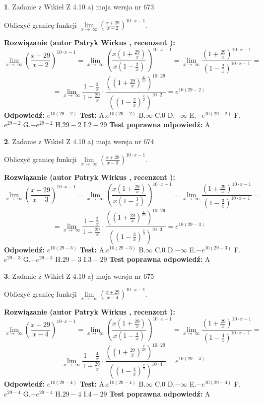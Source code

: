 \documentclass[12pt, a4paper]{article}
\theoremstyle{definition} %
\newtheorem{zad}{}
\newcommand{\zadStart}[1]{\begin{zad}#1\newline}
\newcommand{\zadStop}{\end{zad}}
\newcommand{\rozwStart}[2]{\noindent \textbf{Rozwiązanie (autor #1 , recenzent #2): }\newline}
\newcommand{\rozwStop}{\newline}
\newcommand{\odpStart}{\noindent \textbf{Odpowiedź:}\newline}
\newcommand{\odpStop}{\newline}
\newcommand{\testStart}{\noindent \textbf{Test:}\newline}
\newcommand{\testStop}{\newline}
\newcommand{\kluczStart}{\noindent \textbf{Test poprawna odpowiedź:}\newline}
\newcommand{\kluczStop}{\newline}
\begin{document}
\zadStart{Zadanie z Wikieł Z 4.10 a) moja wersja nr 673}


Obliczyć granicę funkcji  $\lim\limits_{x\to\ \infty}(\frac{x+29}{x-2})^{10\cdot x-1}$.
\zadStop
\rozwStart{Patryk Wirkus}{}
$$\lim\limits_{x\to\ \infty}(\frac{x+29}{x-2})^{10\cdot x-1} = \lim\limits_{x\to\ \infty}(\frac{x(1+\frac{29}{x})}{x(1-\frac{2}{x})})^{10\cdot x-1}=\lim\limits_{x\to\ \infty}\frac{(1+\frac{29}{x})^{10\cdot x-1}}{(1-\frac{2}{x})^{10\cdot x-1}}=$$
$$=\lim\limits_{x\to\ \infty}\frac{1-\frac{2}{x}}{1+\frac{29}{x}}\cdot\frac{((1+\frac{29}{x})^{\frac{x}{29}})^{10\cdot29}}{((1-\frac{2}{x})^{\frac{x}{2}})^{10\cdot2}}=e^{10(29-2)}$$
\rozwStop
\odpStart
$e^{10(29-2)}$
\odpStop
\testStart
A.$e^{10(29-2)}$ B.$\infty$ C.$0$ D.$-\infty$ E.$-e^{10(29-2)}$
F.$e^{29-2}$ G.$-e^{29-2}$
H.$29-2$
I.$2-29$
\testStop
\kluczStart
A
\kluczStop



\zadStart{Zadanie z Wikieł Z 4.10 a) moja wersja nr 674}


Obliczyć granicę funkcji  $\lim\limits_{x\to\ \infty}(\frac{x+29}{x-3})^{10\cdot x-1}$.
\zadStop
\rozwStart{Patryk Wirkus}{}
$$\lim\limits_{x\to\ \infty}(\frac{x+29}{x-3})^{10\cdot x-1} = \lim\limits_{x\to\ \infty}(\frac{x(1+\frac{29}{x})}{x(1-\frac{3}{x})})^{10\cdot x-1}=\lim\limits_{x\to\ \infty}\frac{(1+\frac{29}{x})^{10\cdot x-1}}{(1-\frac{3}{x})^{10\cdot x-1}}=$$
$$=\lim\limits_{x\to\ \infty}\frac{1-\frac{3}{x}}{1+\frac{29}{x}}\cdot\frac{((1+\frac{29}{x})^{\frac{x}{29}})^{10\cdot29}}{((1-\frac{3}{x})^{\frac{x}{3}})^{10\cdot3}}=e^{10(29-3)}$$
\rozwStop
\odpStart
$e^{10(29-3)}$
\odpStop
\testStart
A.$e^{10(29-3)}$ B.$\infty$ C.$0$ D.$-\infty$ E.$-e^{10(29-3)}$
F.$e^{29-3}$ G.$-e^{29-3}$
H.$29-3$
I.$3-29$
\testStop
\kluczStart
A
\kluczStop



\zadStart{Zadanie z Wikieł Z 4.10 a) moja wersja nr 675}


Obliczyć granicę funkcji  $\lim\limits_{x\to\ \infty}(\frac{x+29}{x-4})^{10\cdot x-1}$.
\zadStop
\rozwStart{Patryk Wirkus}{}
$$\lim\limits_{x\to\ \infty}(\frac{x+29}{x-4})^{10\cdot x-1} = \lim\limits_{x\to\ \infty}(\frac{x(1+\frac{29}{x})}{x(1-\frac{4}{x})})^{10\cdot x-1}=\lim\limits_{x\to\ \infty}\frac{(1+\frac{29}{x})^{10\cdot x-1}}{(1-\frac{4}{x})^{10\cdot x-1}}=$$
$$=\lim\limits_{x\to\ \infty}\frac{1-\frac{4}{x}}{1+\frac{29}{x}}\cdot\frac{((1+\frac{29}{x})^{\frac{x}{29}})^{10\cdot29}}{((1-\frac{4}{x})^{\frac{x}{4}})^{10\cdot4}}=e^{10(29-4)}$$
\rozwStop
\odpStart
$e^{10(29-4)}$
\odpStop
\testStart
A.$e^{10(29-4)}$ B.$\infty$ C.$0$ D.$-\infty$ E.$-e^{10(29-4)}$
F.$e^{29-4}$ G.$-e^{29-4}$
H.$29-4$
I.$4-29$
\testStop
\kluczStart
A
\kluczStop
\end{document}
